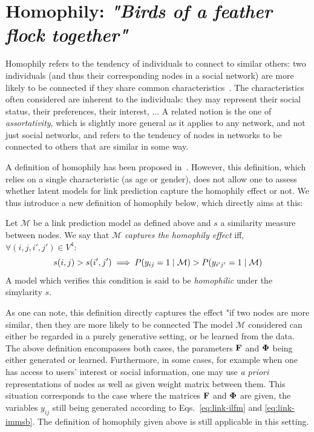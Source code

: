 \section{Homophily: \emph{"Birds of a feather flock together"}}
\label{sec:homophily}

Homophily refers to the tendency of individuals to connect to similar others: two individuals (and thus their corresponding nodes in a social network) are more likely to be connected if they share common characteristics~\cite{mcpherson2001birds,lazarsfeld1954friendship}. The characteristics often considered are inherent to the individuals: they may represent their social status, their preferences, their interest, ... A related notion is the one of {\it assortativity}, which is slightly more general as it applies to any network, and not just social networks, and refers to the tendency of nodes in networks to be connected to others that are similar in some way.

A definition of homophily has been proposed in~\cite{la2010randomization}. However, this definition, which relies on a single characteristic (as age or gender), does not allow one to assess whether latent models for link prediction capture the homophily effect or not. We thus introduce a new definition of homophily below, which directly aims at this:
%
\begin{definition}[Homophily]
	Let $\mathcal{M}$ be a link prediction model as defined above and $s$ a similarity measure between nodes. We say that \emph{$\mathcal{M}$ captures the homophily effect} iff, $\forall (i,j,i',j') \in V^4$:
%
\begin{equation}
s(i,j) > s(i',j')  \implies P(y_{ij}=1 \mid \mathcal{M}) > P(y_{i'j'}=1  \mid \mathcal{M}) \nonumber
\end{equation}
%
A model which verifies this condition is said to be \emph{homophilic} under the simylarity $s$.
\end{definition}
%
As one can note, this definition directly captures the effect "if two nodes are more similar, then they are more likely to be connected The model $\mathcal{M}$ considered can either be regarded in a purely generative setting, or be learned from the data. The above definition encompasses both cases, the parameters $\mathbf{F}$ and $\mathbf{\Phi}$ being either generated or learned. Furthermore, in some cases, for example when one has access to users' interest or social information, one may use \textit{a priori} representations of nodes as well as given weight matrix between them. This situation corresponds to the case where the matrices $\mathbf{F}$ and $\mathbf{\Phi}$ are given, the variables $y_{ij}$ still being generated according to Eqs.~\ref{eq:link-ilfm} and \ref{eq:link-immsb}. The definition of homophily given above is still applicable in this setting.


